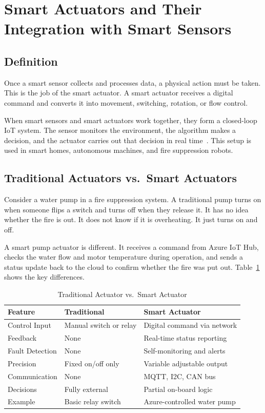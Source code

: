 \documentclass[conference]{IEEEtran}
\begin{document}
\section{Smart Actuators and Their Integration with Smart Sensors}
\label{sec:actuators}

\subsection{Definition}

Once a smart sensor collects and processes data, a physical action must be taken. This is the job of the smart actuator. A smart actuator receives a digital command and converts it into movement, switching, rotation, or flow control.

When smart sensors and smart actuators work together, they form a closed-loop IoT system. The sensor monitors the environment, the algorithm makes a decision, and the actuator carries out that decision in real time~\cite{bridgera2024}. This setup is used in smart homes, autonomous machines, and fire suppression robots.

\subsection{Traditional Actuators vs.\ Smart Actuators}

Consider a water pump in a fire suppression system. A traditional pump turns on when someone flips a switch and turns off when they release it. It has no idea whether the fire is out. It does not know if it is overheating. It just turns on and off.

A smart pump actuator is different. It receives a command from Azure IoT Hub, checks the water flow and motor temperature during operation, and sends a status update back to the cloud to confirm whether the fire was put out. Table~\ref{tab:actuator_compare} shows the key differences.

\begin{table}[htbp]
\caption{Traditional Actuator vs.\ Smart Actuator}
\label{tab:actuator_compare}
\centering
\begin{tabular}{|l|l|l|}
\hline
\textbf{Feature} & \textbf{Traditional} & \textbf{Smart Actuator} \\
\hline
Control Input & Manual switch or relay & Digital command via network \\
Feedback & None & Real-time status reporting \\
Fault Detection & None & Self-monitoring and alerts \\
Precision & Fixed on/off only & Variable adjustable output \\
Communication & None & MQTT, I2C, CAN bus \\
Decisions & Fully external & Partial on-board logic \\
Example & Basic relay switch & Azure-controlled water pump \\
\hline
\end{tabular}
\end{table}
\end{document}
